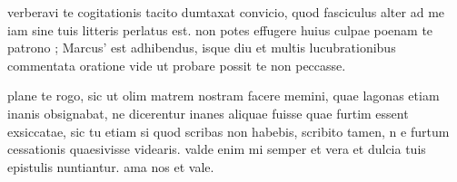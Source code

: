 


 verberavi te cogitationis tacito dumtaxat convicio, quod fasciculus alter ad me iam sine tuis litteris perlatus est. non potes effugere huius culpae poenam te patrono ; Marcus' est adhibendus, isque diu et multis lucubrationibus commentata oratione vide ut probare possit te non peccasse.

 plane te rogo, sic ut olim matrem nostram facere memini, quae lagonas etiam inanis obsignabat, ne dicerentur inanes aliquae fuisse quae furtim essent exsiccatae, sic tu etiam si quod scribas non habebis, scribito tamen, n e furtum cessationis quaesivisse videaris. valde enim mi semper et vera et dulcia tuis epistulis nuntiantur. ama nos et vale.
